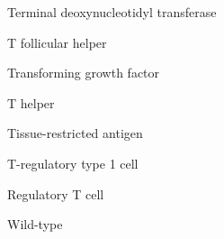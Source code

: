  \tabto{5.5em} Terminal deoxynucleotidyl transferase

 \tabto{5.5em} T follicular helper

 \tabto{5.5em} Transforming growth factor

 \tabto{5.5em} T helper

 \tabto{5.5em} Tissue-restricted antigen

 \tabto{5.5em} T-regulatory type 1 cell

 \tabto{5.5em} Regulatory T cell

 \tabto{5.5em} Wild-type

\setlength{\parindent}{16pt}
\setlength{\parskip}{6pt}